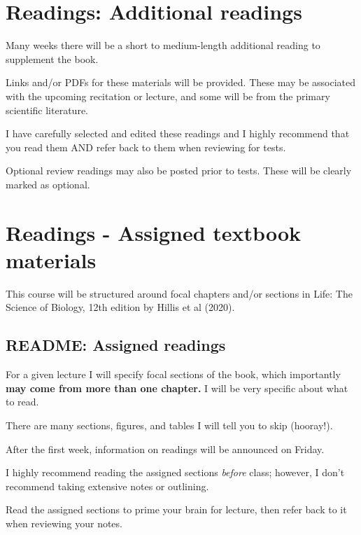 \documentclass[
]{book}
\begin{document}
\hypertarget{readings-additional-readings}{%
\chapter{Readings: Additional readings}\label{readings-additional-readings}}

Many weeks there will be a short to medium-length additional reading to supplement the book.

Links and/or PDFs for these materials will be provided. These may be associated with the upcoming recitation or lecture, and some will be from the primary scientific literature.

I have carefully selected and edited these readings and I highly recommend that you read them AND refer back to them when reviewing for tests.

Optional review readings may also be posted prior to tests. These will be clearly marked as optional.

\hypertarget{readings---assigned-textbook-materials}{%
\chapter{Readings - Assigned textbook materials}\label{readings---assigned-textbook-materials}}

This course will be structured around focal chapters and/or sections in Life: The Science of Biology, 12th edition by Hillis et al (2020).

\hypertarget{readme-assigned-readings}{%
\section{README: Assigned readings}\label{readme-assigned-readings}}

For a given lecture I will specify focal sections of the book, which importantly \textbf{may come from more than one chapter.} I will be very specific about what to read.

There are many sections, figures, and tables I will tell you to skip (hooray!).

After the first week, information on readings will be announced on Friday.

I highly recommend reading the assigned sections \emph{before} class; however, I don't recommend taking extensive notes or outlining.

Read the assigned sections to prime your brain for lecture, then refer back to it when reviewing your notes.
\end{document}
